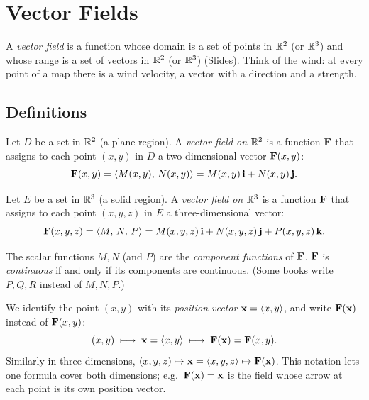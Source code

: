 \section{Vector Fields}\label{ch:fields}

A \emph{vector field} is a function whose domain is a set of points in $\mathbb{R}^2$
(or $\mathbb{R}^3$) and whose range is a set of vectors in $\mathbb{R}^2$ (or $\mathbb{R}^3$) (Slides).
Think of the wind: at every point of a map there is a wind velocity, a vector
with a direction and a strength.

\subsection{Definitions}

\begin{definition}\label{def:vf2}
Let $D$ be a set in $\mathbb{R}^2$ (a plane region). A \emph{vector field on $\mathbb{R}^2$} is a
function $\mathbf{F}$ that assigns to each point $(x,y)$ in $D$ a two-dimensional
vector $\mathbf{F}(x,y)$:
\[
  \mathbf{F}(x,y)=\left\langle M(x,y),\,N(x,y) \right\rangle=M(x,y)\,\mathbf{i}+N(x,y)\,\mathbf{j} .
\]
\end{definition}

\begin{definition}\label{def:vf3}
Let $E$ be a set in $\mathbb{R}^3$ (a solid region). A \emph{vector field on $\mathbb{R}^3$} is a
function $\mathbf{F}$ that assigns to each point $(x,y,z)$ in $E$ a three-dimensional
vector:
\[
  \mathbf{F}(x,y,z)=\left\langle M,\,N,\,P \right\rangle=M(x,y,z)\,\mathbf{i}+N(x,y,z)\,\mathbf{j}+P(x,y,z)\,\mathbf{k} .
\]
\end{definition}

The scalar functions $M,N$ (and $P$) are the \emph{component functions} of
$\mathbf{F}$. $\mathbf{F}$ is \emph{continuous} if and only if its components are continuous.
(Some books write $P,Q,R$ instead of $M,N,P$.)

\begin{remark}\label{rem:position}
We identify the point $(x,y)$ with its \emph{position vector}
$\mathbf{x}=\left\langle x,y \right\rangle$, and write $\mathbf{F}(\mathbf{x})$ instead of $\mathbf{F}(x,y)$:
\[
  (x,y)\;\longmapsto\;\mathbf{x}=\left\langle x,y \right\rangle\;\longmapsto\;\mathbf{F}(\mathbf{x})=\mathbf{F}(x,y).
\]
Similarly in three dimensions, $(x,y,z)\mapsto\mathbf{x}=\left\langle x,y,z \right\rangle\mapsto\mathbf{F}(\mathbf{x})$.
This notation lets one formula cover both dimensions; e.g.\ $\mathbf{F}(\mathbf{x})=\mathbf{x}$ is
the field whose arrow at each point is its own position vector.
\end{remark}

